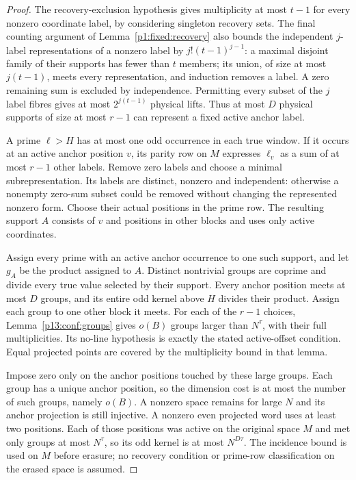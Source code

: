 \begin{proof}
The recovery-exclusion hypothesis gives multiplicity at most $t-1$
for every nonzero coordinate label, by considering singleton recovery
sets. The final counting argument of Lemma~\ref{p1:fixed:recovery}
also bounds the independent $j$-label representations of a nonzero
label by $j!(t-1)^{j-1}$: a maximal disjoint family of their supports
has fewer than $t$ members; its union, of size at most $j(t-1)$,
meets every representation, and induction removes a label. A zero
remaining sum is excluded by independence. Permitting every subset
of the $j$ label fibres gives at most $2^{j(t-1)}$ physical lifts.
Thus at most $D$ physical supports of size at most $r-1$ can
represent a fixed active anchor label.

A prime $\ell>H$ has at most one odd occurrence in each true window.
If it occurs at an active anchor position $v$, its parity row on
$M$ expresses $\ell_v$ as a sum of at most $r-1$ other labels.
Remove zero labels and choose a minimal subrepresentation.
Its labels are distinct, nonzero and independent: otherwise a
nonempty zero-sum subset could be removed without changing the
represented nonzero form. Choose their actual positions in the
prime row. The resulting support $A$ consists of $v$ and positions
in other blocks and uses only active coordinates.

Assign every prime with an active anchor occurrence to one such
support, and let $g_A$ be the product assigned to $A$. Distinct
nontrivial groups are coprime and divide every true value selected
by their support. Every anchor position meets at most $D$ groups,
and its entire odd kernel above $H$ divides their product.
Assign each group to one other block it meets.
For each of the $r-1$ choices, Lemma~\ref{p13:conf:groups} gives
$o(B)$ groups larger than $N^\tau$, with their full multiplicities.
Its no-line hypothesis is exactly the stated active-offset
condition. Equal projected points are covered by the multiplicity
bound in that lemma.

Impose zero only on the anchor positions touched by these large
groups. Each group has a unique anchor position, so the dimension
cost is at most the number of such groups, namely $o(B)$.
A nonzero space remains for large $N$ and its anchor projection
is still injective. A nonzero even projected word uses at least
two positions. Each of those positions was active on the original
space $M$ and met only groups at most $N^\tau$, so its odd kernel
is at most $N^{D\tau}$. The incidence bound is used on $M$ before
erasure; no recovery condition or prime-row classification on the
erased space is assumed.
\end{proof}

